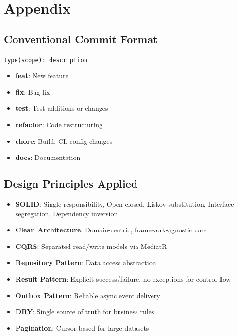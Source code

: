 \documentclass[12pt,a4paper,twoside]{report}
\begin{document}
\chapter{Appendix}

\section{Conventional Commit Format}
\verb|type(scope): description|
\begin{itemize}
    \item \textbf{feat}: New feature
    \item \textbf{fix}: Bug fix
    \item \textbf{test}: Test additions or changes
    \item \textbf{refactor}: Code restructuring
    \item \textbf{chore}: Build, CI, config changes
    \item \textbf{docs}: Documentation
\end{itemize}

\section{Design Principles Applied}
\begin{itemize}
    \item \textbf{SOLID}: Single responsibility, Open-closed, Liskov substitution, Interface segregation, Dependency inversion
    \item \textbf{Clean Architecture}: Domain-centric, framework-agnostic core
    \item \textbf{CQRS}: Separated read/write models via MediatR
    \item \textbf{Repository Pattern}: Data access abstraction
    \item \textbf{Result Pattern}: Explicit success/failure, no exceptions for control flow
    \item \textbf{Outbox Pattern}: Reliable async event delivery
    \item \textbf{DRY}: Single source of truth for business rules
    \item \textbf{Pagination}: Cursor-based for large datasets
\end{itemize}
\end{document}
